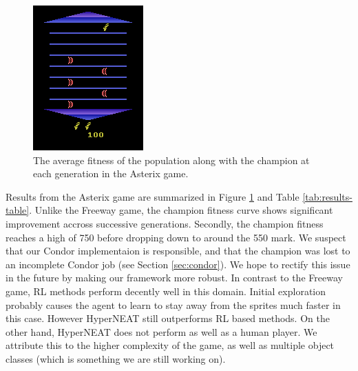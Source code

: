 \documentclass{acm_proc_article-sp}
\begin{document}
\begin{figure}[ht]
\begin{center}
\includegraphics[width=\columnwidth]{figures/asterix}
\end{center}
\caption{The average fitness of the population along with the champion at each generation in the Asterix game.}
\label{fig:asterix-curve}
\end{figure}

Results from the Asterix game are summarized in Figure \ref{fig:asterix-curve} and Table \ref{tab:results-table}. Unlike the Freeway game, the champion fitness curve shows significant improvement accross successive generations. Secondly, the champion fitness reaches a high of 750 before dropping down to around the 550 mark. We suspect that our Condor implementaion is responsible, and that the champion was lost to an incomplete Condor job (see Section \ref{sec:condor}). We hope to rectify this issue in the future by making our framework more robust. In contrast to the Freeway game, RL methods perform decently well in this domain. Initial exploration probably causes the agent to learn to stay away from the sprites much faster in this case. However HyperNEAT still outperforms RL based methods. On the other hand, HyperNEAT does not perform as well as a human player. We attribute this to the higher complexity of the game, as well as multiple object classes (which is something we are still working on). 
\end{document}
